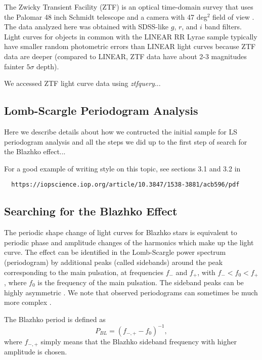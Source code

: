 The Zwicky Transient Facility (ZTF) is an optical time-domain survey that uses the Palomar 48 inch Schmidt telescope
and a camera with 47 deg$^2$ field of view \citep{2019PASP..131a8002B}. The data analyzed here was obtained with
SDSS-like $g$, $r$, and $i$ band filters. Light curves for objects in common with the LINEAR RR Lyrae sample typically
have smaller random photometric errors than LINEAR light curves because ZTF data are deeper (compared to LINEAR,
ZTF data have about 2-3 magnitudes fainter  $5\sigma$ depth).

We accessed ZTF light curve data using {\it ztfquery}...




\subsection{Lomb-Scargle Periodogram Analysis}

Here we describe details about how we contructed the initial sample for LS periodogram analysis and all the
steps we did up to the first step of search for the Blazhko effect... 

For a good example of writing style on this topic, see sections 3.1 and 3.2 in
\begin{verbatim}
  https://iopscience.iop.org/article/10.3847/1538-3881/acb596/pdf
\end{verbatim}

\subsection{Searching for the Blazhko Effect}

The periodic shape change of light curves for Blazhko stars is equivalent to periodic phase and amplitude changes of the
harmonics which make up the light curve. The effect can be identified in the Lomb-Scargle power spectrum (periodogram)
by additional peaks (called sidebands) around the peak corresponding to the main pulsation, at frequencies $f_-$ and $f_+$,
with $f_- < f_0 < f_+$, where $f_0$ is the frequency of the main pulsation. The sideband peaks can be highly asymmetric
\cite{2003ApJ...598..597A}. We note that observed periodograms can sometimes be much more complex \cite{2007MNRAS.377.1263S}. 

The Blazhko period is defined as
\begin{equation}
  P_{BL} = (f_{-,+} - f_0)^{-1},
\end{equation}
where $f_{-,+}$ simply means that the Blazhko sideband frequency with higher amplitude is chosen. 

